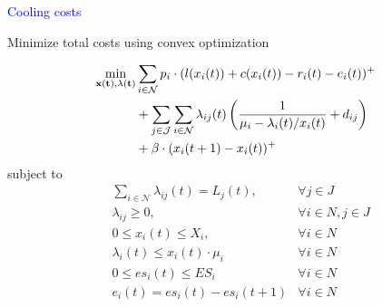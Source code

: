 \documentclass[xcolor=dvipsnames]{beamer}
\begin{document}
\begin{frame}{\textcolor{blue}{Cooling costs}}


\end{frame}

\begin{frame}{Minimize total costs using convex optimization}

\begin{align*}
\min_{\bf{x}(t), \bf{\lambda}(t)} & \sum_{i \in \mathcal{N}} p_i \cdot (l(x_i(t)) + c(x_i(t)) - r_i(t) - e_i(t))^+ \\
& + \sum_{j \in \mathcal{J}}\sum_{i \in \mathcal{N}}
\lambda_{ij}(t)\left(\frac{1}{\mu_i - \lambda_i(t)/x_i(t)} + d_{ij}\right) \\
& + \beta \cdot (x_i(t+1) - x_i(t))^+
\end{align*}
\vspace{-2mm}
subject to
\begin{align*}
& \sum_{i\in \mathcal{N}}\lambda_{ij}(t) = L_j(t), &\forall j\in J \\
& \lambda_{ij} \geq 0, & \forall i\in N, j\in J \\
& 0 \leq x_i(t) \leq X_i, & \forall i \in N \\
& \lambda_i(t) \leq x_i(t) \cdot \mu_i & \forall i \in N \\
& 0 \leq es_i(t) \leq ES_i & \forall i \in N \\
& e_i(t) = es_i(t) - es_i(t+1) & \forall i \in N
\end{align*}

\end{frame}
\end{document}
